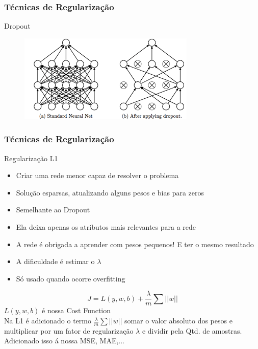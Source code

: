 \documentclass{beamer}
\begin{document}
\begin{frame}
	\frametitle{Técnicas de Regularização}
	\begin{block}{Dropout}
		\begin{figure}
			\centering
			\includegraphics[width=1\linewidth]{figures/dropout}
		\end{figure}
	\end{block}
\end{frame}
\begin{frame}
	\frametitle{Técnicas de Regularização}
	\begin{block}{Regularização L1}
		\begin{itemize}
			\item Criar uma rede menor capaz de resolver o problema
			\item Solução esparsas, atualizando alguns pesos e bias para zeros
			\item Semelhante ao Dropout
			\item Ela deixa apenas os atributos mais relevantes para a rede
			\item A rede é obrigada a aprender com pesos pequenos! E ter o mesmo resultado
			\item A dificuldade é estimar o $\lambda$
			\item Só usado quando ocorre overfitting
		\end{itemize}
	$$J = L(y, w, b) + \frac{\lambda}{m} \sum ||w||$$
	$L(y, w, b)$ é nossa Cost Function \\
	Na L1 é adicionado o termo $ \frac{\lambda}{m} \sum ||w||$  somar o valor absoluto dos pesos e multiplicar por um fator de regularização $\lambda$ e dividir pela Qtd. de amostras. Adicionado isso á nossa MSE, MAE,...
	\end{block}
\end{frame}
\end{document}
